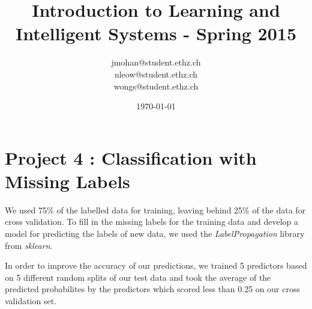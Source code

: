 \documentclass[a4paper, 11pt]{article}
\title{Introduction to Learning and Intelligent Systems - Spring 2015}
\author{jmohan@student.ethz.ch\\ nleow@student.ethz.ch\\ wongs@student.ethz.ch\\}
\date{\today}
\begin{document}
\maketitle

\section*{Project 4 : Classification with Missing Labels}

We used 75\% of the labelled data for training, leaving behind 25\% of the data for cross validation. To fill in the missing labels for the training data and develop a model for predicting the labels of new data, we used the \textit{LabelPropagation} library from \textit{sklearn}.

In order to improve the accuracy of our predictions, we trained 5 predictors based on 5 different random splits of our test data and took the average of the predicted probabilites by the predictors which scored less than 0.25 on our cross validation set.
\end{document}
